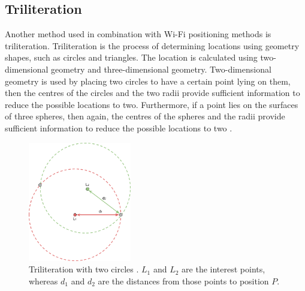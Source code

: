
\subsection{Triliteration}
\label{sec:triliteration}

Another method used in combination with Wi-Fi positioning methods is triliteration. Triliteration is the process of determining locations using geometry shapes, such as circles and triangles. The location is calculated using two-dimensional geometry and three-dimensional geometry. Two-dimensional geometry is used by placing two circles to have a certain point lying on them, then the centres of the circles and the two radii provide sufficient information to reduce the possible locations to two. Furthermore, if a point lies on the surfaces of three spheres, then again, the centres of the spheres and the radii provide sufficient information to reduce the possible locations to two \cite{triliteration-methods}.

\begin{figure}[H]
    \centering
    \includegraphics[width=170px, height=197px]{res/Trilateration2.png}
    \centering
    \caption{Triliteration with two circles \cite{triliteration-image}. $L_1$ and $L_2$ are the interest points, whereas $d_1$ and $d_2$ are the distances from those points to position $P$.}
    \label{fig:triliteration-2}
\end{figure}

